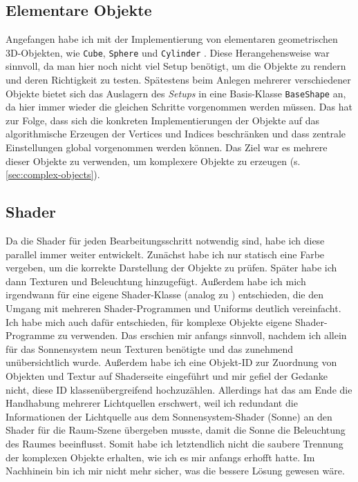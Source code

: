 \documentclass{article}
\let\oldsubsection\subsection
\renewcommand\subsection{\needspace{10\baselineskip}\oldsubsection}
\begin{document}
\subsection{Elementare Objekte} \label{sec:elementary-objects}
Angefangen habe ich mit der Implementierung von elementaren geometrischen 3D-Objekten, wie \texttt{Cube}, \texttt{Sphere} \cite{sphere} und \texttt{Cylinder} \cite{cylinder}.
Diese Herangehensweise war sinnvoll, da man hier noch nicht viel Setup benötigt, um die Objekte zu rendern und deren Richtigkeit zu testen.
Spätestens beim Anlegen mehrerer verschiedener Objekte bietet sich das Auslagern des \textit{Setups} in eine Basis-Klasse \texttt{BaseShape} an, da hier immer wieder die gleichen Schritte vorgenommen werden müssen.
Das hat zur Folge, dass sich die konkreten Implementierungen der Objekte auf das algorithmische Erzeugen der Vertices und Indices beschränken und dass zentrale Einstellungen global vorgenommen werden können.
Das Ziel war es mehrere dieser Objekte zu verwenden, um komplexere Objekte zu erzeugen (s. \ref{sec:complex-objects}).

\subsection{Shader}
Da die Shader für jeden Bearbeitungsschritt notwendig sind, habe ich diese parallel immer weiter entwickelt. 
Zunächst habe ich nur statisch eine Farbe vergeben, um die korrekte Darstellung der Objekte zu prüfen.
Später habe ich dann Texturen und Beleuchtung hinzugefügt.
Außerdem habe ich mich irgendwann für eine eigene Shader-Klasse (analog zu \cite{shader-class}) entschieden, die den Umgang mit mehreren Shader-Programmen und Uniforms deutlich vereinfacht.
Ich habe mich auch dafür entschieden, für komplexe Objekte eigene Shader-Programme zu verwenden.
Das erschien mir anfangs sinnvoll, nachdem ich allein für das Sonnensystem neun Texturen benötigte und das zunehmend unübersichtlich wurde. 
Außerdem habe ich eine Objekt-ID zur Zuordnung von Objekten und Textur auf Shaderseite eingeführt und mir gefiel der Gedanke nicht, diese ID klassenübergreifend hochzuzählen.
Allerdings hat das am Ende die Handhabung mehrerer Lichtquellen erschwert, weil ich redundant die Informationen der Lichtquelle aus dem Sonnensystem-Shader (Sonne) an den Shader für die Raum-Szene übergeben musste, damit die Sonne die Beleuchtung des Raumes beeinflusst.
Somit habe ich letztendlich nicht die saubere Trennung der komplexen Objekte erhalten, wie ich es mir anfangs erhofft hatte.
Im Nachhinein bin ich mir nicht mehr sicher, was die bessere Lösung gewesen wäre. 
\end{document}
